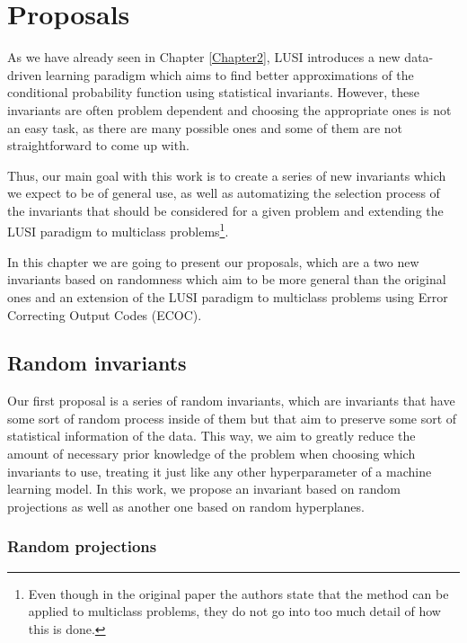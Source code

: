 
\newcommand{\reals}[1]{\mathbb{R}^{#1}}

\chapter{Proposals} %
\label{Chapter3}

As we have already seen in Chapter \ref{Chapter2}, LUSI introduces a new data-driven learning
paradigm which aims to find better approximations of the conditional probability function using
statistical invariants. However, these invariants are often problem dependent and choosing the
appropriate ones is not an easy task, as there are many possible ones and some of them are not
straightforward to come up with.

Thus, our main goal with this work is to create a series of new invariants which we expect to be of
general use, as well as automatizing the selection process of the invariants that should be considered
for a given problem and extending the LUSI paradigm to multiclass problems\footnote{Even though in the
original paper the authors state that the method can be applied to multiclass problems, they do not go
into too much detail of how this is done.}.

In this chapter we are going to present our proposals, which are a two new invariants based on randomness
which aim to be more general than the original ones and an extension of the LUSI paradigm to multiclass problems
using Error Correcting Output Codes (ECOC).

\section{Random invariants}

Our first proposal is a series of random invariants, which are invariants that have some sort of random
process inside of them but that aim to preserve some sort of statistical information of the data. This way,
we aim to greatly reduce the amount of necessary prior knowledge of the problem when choosing which invariants
to use, treating it just like any other hyperparameter of a machine learning model. In this work, we propose
an invariant based on random projections as well as another one based on random hyperplanes.

\subsection{Random projections}

